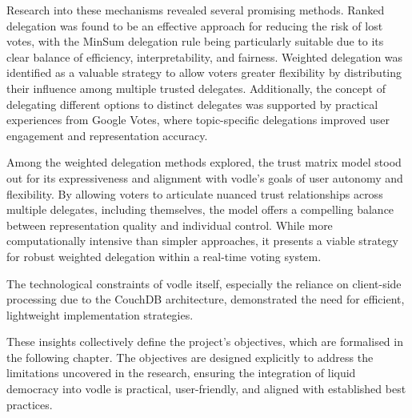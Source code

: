 Research into these mechanisms revealed several promising methods. Ranked delegation was found to be an effective approach for reducing the risk of lost votes, with the MinSum delegation rule being particularly suitable due to its clear balance of efficiency, interpretability, and fairness. Weighted delegation was identified as a valuable strategy to allow voters greater flexibility by distributing their influence among multiple trusted delegates. Additionally, the concept of delegating different options to distinct delegates was supported by practical experiences from Google Votes, where topic-specific delegations improved user engagement and representation accuracy.

Among the weighted delegation methods explored, the trust matrix model stood out for its expressiveness and alignment with vodle's goals of user autonomy and flexibility. By allowing voters to articulate nuanced trust relationships across multiple delegates, including themselves, the model offers a compelling balance between representation quality and individual control. While more computationally intensive than simpler approaches, it presents a viable strategy for robust weighted delegation within a real-time voting system.

The technological constraints of vodle itself, especially the reliance on client-side processing due to the CouchDB architecture, demonstrated the need for efficient, lightweight implementation strategies.

These insights collectively define the project's objectives, which are formalised in the following chapter. The objectives are designed explicitly to address the limitations uncovered in the research, ensuring the integration of liquid democracy into vodle is practical, user-friendly, and aligned with established best practices.